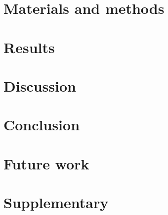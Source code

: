\documentclass[10pt]{article}
\begin{document}
	
	\label{section:Chap_Monte_Carlo}
	\newpage
	
	
	\label{section:Chap_Cell_Death}
	\newpage
	
	\section{Materials and methods}
	
	\label{section:Chap_Material_and_Methods}
	\newpage
	
	\section{Results}
	
	\label{section:Chap_Results}
	\newpage
	
	\section{Discussion}
	
	\label{section:Chap_Discussion}
	\newpage
	
	\section{Conclusion}
	
	\label{section:Chap_Conclusion}
	\section{Future work}
	
	\label{section:Chap_Future_Work}
	\newpage
	
	
	\printbibliography
	\newpage
	
	\section*{Supplementary}
	
	\label{section:Chap_Supplementary}
	\newpage
	

	
	
\end{document}
